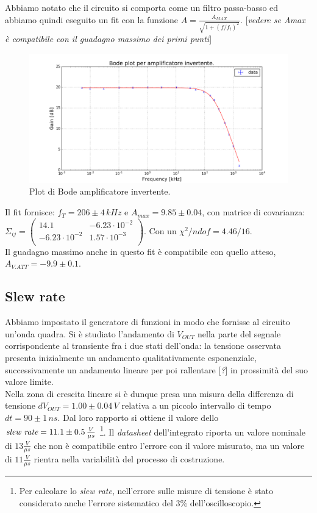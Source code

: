 \documentclass[10pt,a4paper]{article}
\newcommand{\rem}[1]{[\emph{#1}]}
\begin{document}
Abbiamo notato che il circuito si comporta come un filtro passa-basso ed abbiamo quindi  eseguito un fit con la funzione $ A=\frac{A_{MAX}}{\sqrt{1+(f/f_t)^2}}$.
\rem{vedere se Amax è compatibile con il guadagno massimo dei primi punti}

\begin{figure}[!htb]
  \centering
  \includegraphics[scale=0.5]{bodePlot.png}
\caption{Plot di Bode amplificatore invertente.}
\label{graficoBode}
\end{figure}

Il fit fornisce: $f_T = 206 \pm 4 \, kHz$ e $A_{max} = 9.85 \pm 0.04$, con matrice di covarianza:\\
$ \Sigma_{ij} = \left( \begin{array}{cc}
14.1 & -6.23 \cdot 10^{-2} \\ 
-6.23 \cdot 10^{-2} & 1.57 \cdot 10^{-3}\\
\end{array} \right)$. Con un $\chi^2/ndof = 4.46/16$.\\

Il guadagno massimo anche in questo fit è compatibile con quello atteso, $A_{V.ATT}= -9.9 \pm 0.1$.

\subsection{Slew rate}
Abbiamo impostato il generatore di funzioni in modo che fornisse al circuito un’onda quadra. Si è studiato l'andamento di $V_{OUT}$ nella parte del segnale corrispondente al transiente fra i due stati dell’onda: la tensione osservata presenta inizialmente un andamento qualitativamente esponenziale, successivamente un andamento lineare per poi rallentare \rem{?} in prossimità del suo valore limite.\\
Nella zona di crescita lineare si è dunque presa una misura della differenza di tensione $dV_{OUT} = 1.00 \pm 0.04 \, V$ relativa a un piccolo intervallo di tempo $dt=90 \pm 1 \, ns$. Dal loro rapporto si ottiene il valore dello $\emph{slew rate}= 11.1 \pm 0.5 \, \frac{V}{\mu s}$ \footnote{Per calcolare lo \emph{slew rate}, nell'errore sulle misure di tensione è stato considerato anche l'errore sistematico del $3\%$ dell'oscilloscopio.}. Il \emph{datasheet} dell'integrato riporta un valore nominale di $13 \frac{V}{\mu s}$ che non è compatibile entro l'errore con il valore misurato, ma un valore di $11 \frac{V}{\mu s}$ rientra nella variabilità del processo di costruzione.
\end{document}
